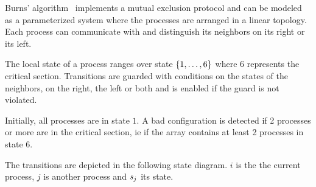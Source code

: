 Burns' algorithm~\cite{Burns:protocol} implements a mutual exclusion
protocol and can be modeled as a parameterized system where the
processes are arranged in a linear topology. Each process can
communicate with and distinguish its neighbors on its right or its
left.

The local state of a process ranges over state $\{1,\ldots,6\}$ where
$6$ represents the critical section. Transitions are guarded with
conditions on the states of the neighbors, on the right, the left or
both and is enabled if the guard is not violated.

Initially, all processes are in state $1$. A bad configuration is
detected if 2 processes or more are in the critical section, ie if the
array contains at least 2 processes in state $6$.

The transitions are depicted in the following state diagram. $i$ is
the the current process, $j$ is another process and $s_{j}$ its
state.

